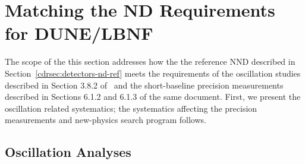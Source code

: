 
\section{Matching the ND Requirements for DUNE/LBNF} 
\label{cdrsec:detectors-nd-ref-fgt-req}

The scope of the this section addresses how the the reference NND
described in Section~\ref{cdrsec:detectors-nd-ref} meets the
requirements of the oscillation studies described in
Section 3.8.2 of~\cite{cdr-vol-2} %
and the short-baseline precision measurements described in Sections 6.1.2
and 6.1.3 of the same document. %
First,
we present the oscillation related systematics; the systematics
affecting the precision measurements and new-physics search program
follows.


\subsection{Oscillation Analyses} 
\label{cdrsec:detectors-nd-ref-fgt-req-oscl}

